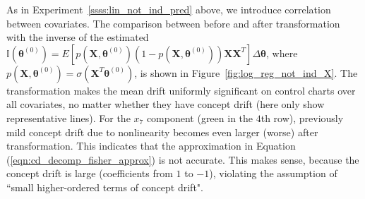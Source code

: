 \documentclass[twoside,11pt]{article}
\begin{document}
\begin{appendix}
As in Experiment~\ref{ssss:lin_not_ind_pred} above, we introduce correlation between {covariates.} The comparison between before and after transformation with {the inverse of the estimated} {$\mathbb {I} ( {\bm{\theta}} ^{ (0)}) = E [{p} (\bm {X},\bm { \theta} ^{ (0)}) (1-{p}(\bm {X},\bm { \theta} ^{ (0)})) \bm {X} \bm {X}^T] \Delta \bm{ \theta}$}, where {$p (\bm {X},\bm { \theta} ^{ (0)}) = \sigma ( \bm {X}^T\bm { \theta} ^{ (0)})$}, is shown in Figure~\ref{fig:log_reg_not_ind_X}. The transformation makes the mean {drift} uniformly significant on control charts over all {covariates,} no matter whether they have concept drift (here only show representative lines). For the $x_7$ component (green in the $4$th row), previously mild concept drift due to nonlinearity becomes even larger (worse) after transformation. This indicates that the approximation in Equation (\ref{eqn:cd_decomp_fisher_approx}) is not accurate. This makes sense, because the concept drift is large (coefficients from $1$ to $-1$), violating the assumption of ``small higher-ordered terms of concept drift".



\end{appendix}
\end{document}
